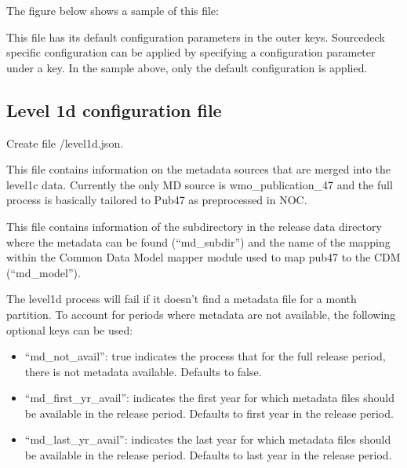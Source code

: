 \documentclass[letterpaper,10pt,english]{sphinxmanual}
\begin{document}
The figure below shows a sample of this file:

\begin{sphinxVerbatim}[commandchars=\\\{\}]
   
   
   
\end{sphinxVerbatim}

This file has its default configuration parameters in the outer keys.
Source\sphinxhyphen{}deck specific configuration can be applied by specifying a configuration
parameter under a  key. In the sample above, only the default
configuration is applied.


\subsection{Level 1d configuration file}
\label{\detokenize{index:level-1d-configuration-file}}\label{\detokenize{index:level1d-config-file}}
Create file /level1d.json.

This file contains information
on the metadata sources that are merged into the level1c data. Currently the
only MD source is wmo\_publication\_47 and the full process is basically tailored
to Pub47 as pre\sphinxhyphen{}processed in NOC.

This file contains information of the subdirectory in the release data directory
where the metadata can be found (“md\_subdir”) and the name of the mapping within the
Common Data Model mapper module used to map pub47 to the CDM (“md\_model”).

The level1d process will fail if it doesn’t find a metadata file for a month
partition. To account for periods where metadata are not available, the
following optional keys can be used:
\begin{itemize}
\item {} 
“md\_not\_avail”: true indicates the process that for the full release period,
there is not metadata available. Defaults to false.

\item {} 
“md\_first\_yr\_avail”: indicates the first year for which metadata files should
be available in the release period. Defaults to first year in the release
period.

\item {} 
“md\_last\_yr\_avail”: indicates the last year for which metadata files should be
available in the release period. Defaults to last year in the release
period.

\end{itemize}
\end{document}
